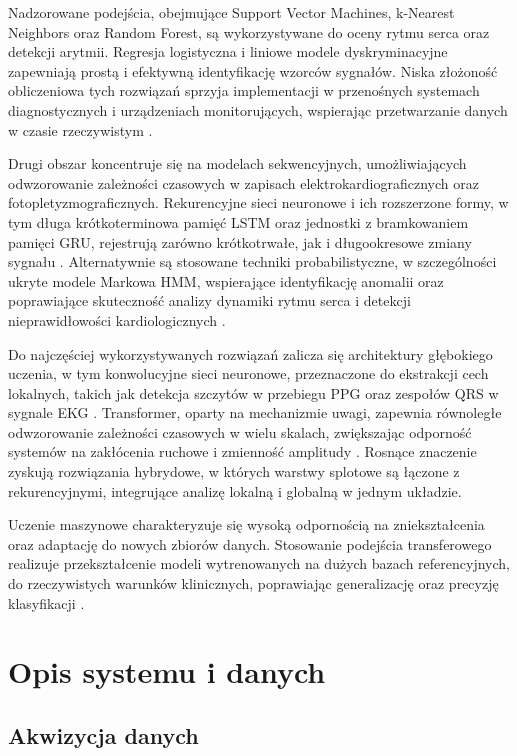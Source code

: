 \documentclass[journal]{IEEEtran}
\begin{document}
Nadzorowane podejścia, obejmujące Support Vector Machines, k-Nearest Neighbors oraz Random Forest, są wykorzystywane do oceny rytmu serca oraz detekcji arytmii. Regresja logistyczna i liniowe modele dyskryminacyjne zapewniają prostą i efektywną identyfikację wzorców sygnałów.
Niska złożoność obliczeniowa tych rozwiązań sprzyja implementacji w przenośnych systemach diagnostycznych i urządzeniach monitorujących, wspierając przetwarzanie danych w czasie rzeczywistym \cite{9}.

Drugi obszar koncentruje się na modelach sekwencyjnych, umożliwiających odwzorowanie zależności czasowych w zapisach elektrokardiograficznych oraz fotopletyzmograficznych.
Rekurencyjne sieci neuronowe i ich rozszerzone formy, w tym długa krótkoterminowa pamięć LSTM oraz jednostki z bramkowaniem pamięci GRU, rejestrują zarówno krótkotrwałe, jak i długookresowe zmiany sygnału \cite{10}. Alternatywnie są stosowane techniki probabilistyczne, w szczególności ukryte modele Markowa HMM, wspierające identyfikację anomalii oraz poprawiające skuteczność analizy dynamiki rytmu serca i detekcji nieprawidłowości kardiologicznych \cite{11}.

\newpage
Do najczęściej wykorzystywanych rozwiązań zalicza się architektury głębokiego uczenia, w tym konwolucyjne sieci neuronowe, przeznaczone do ekstrakcji cech lokalnych, takich jak detekcja szczytów w przebiegu PPG oraz zespołów QRS w sygnale EKG \cite{12}. Transformer, oparty na mechanizmie uwagi, zapewnia równoległe odwzorowanie zależności czasowych w wielu skalach, zwiększając odporność systemów na zakłócenia ruchowe i zmienność amplitudy \cite{13}. Rosnące znaczenie zyskują rozwiązania hybrydowe, w których warstwy splotowe są łączone z rekurencyjnymi, integrujące analizę lokalną i globalną w jednym układzie.


Uczenie maszynowe charakteryzuje się wysoką odpornością na zniekształcenia oraz adaptację do nowych zbiorów danych. Stosowanie podejścia transferowego realizuje przekształcenie modeli wytrenowanych na dużych bazach referencyjnych, do rzeczywistych warunków klinicznych, poprawiając generalizację oraz precyzję klasyfikacji \cite{14}.



\newpage
\section{Opis systemu i danych}
\subsection{Akwizycja danych}
\end{document}
